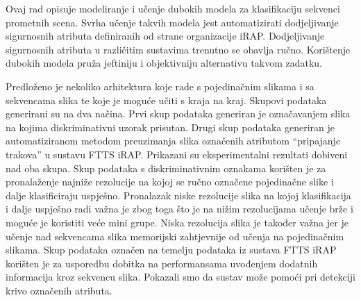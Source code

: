 \documentclass[times, utf8, diplomski, numeric]{fer}
\begin{document}
\begin{sazetak}
Ovaj rad opisuje modeliranje i učenje dubokih modela za klasifikaciju sekvenci prometnih scena.
Svrha učenje takvih modela jest automatizirati dodjeljivanje sigurnosnih atributa definiranih od strane organizacije iRAP.
Dodjeljivanje sigurnosnih atributa u različitim sustavima trenutno se obavlja ručno.
Korištenje dubokih modela pruža jeftiniju i objektivniju alternativu takvom zadatku.

Predloženo je nekoliko arhitektura koje rade s pojedinačnim slikama i sa sekvencama slika te koje je moguće učiti s kraja na kraj.
Skupovi podataka generirani su na dva načina. Prvi skup podataka generiran je označavanjem slika na kojima diskriminativni uzorak prisutan.
Drugi skup podataka generiran je automatiziranom metodom preuzimanja slika označenih atributom ``pripajanje trakova'' u sustavu FTTS iRAP.
Prikazani su eksperimentalni rezultati dobiveni nad oba skupa.
Skup podataka s diskriminativnim oznakama korišten je za pronalaženje najniže rezolucije na kojoj se ručno označene pojedinačne slike i dalje klasificiraju uspješno. 
Pronalazak niske rezolucije slika na kojoj klasifikacija i dalje uspješno radi važna je zbog toga što je na nižim rezolucijama učenje brže i moguće je koristiti veće mini grupe.
Niska rezolucija slika je također važna jer je učenje nad sekvencama slika memorijski zahtjevnije od učenja na pojedinačnim slikama.
Skup podataka označen na temelju podataka iz sustava FTTS iRAP korišten je za usporedbu dobitka na performansama uvođenjem dodatnih informacija kroz sekvencu slika.
Pokazali smo da sustav može pomoći pri detekciji krivo označenih atributa.


 \\
\end{sazetak}
\end{document}
